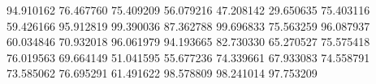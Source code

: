 94.910162
76.467760
75.409209
56.079216
47.208142
29.650635
75.403116
59.426166
95.912819
99.390036
87.362788
99.696833
75.563259
96.087937
60.034846
70.932018
96.061979
94.193665
82.730330
65.270527
75.575418
76.019563
69.664149
51.041595
55.677236
74.339661
67.933083
74.558791
73.585062
76.695291
61.491622
98.578809
98.241014
97.753209
